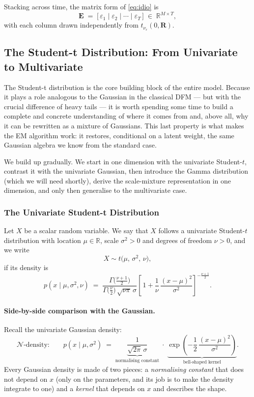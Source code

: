 \documentclass[11pt, a4paper, oneside]{article}
\newcommand{\mE}{\mathbf{E}}
\newcommand{\mR}{\mathbf{R}}
\begin{document}
Stacking across time, the matrix form of \eqref{eq:idio} is
\[
\mE \;=\; \big[\, \varepsilon_1 \mid \varepsilon_2 \mid \cdots \mid \varepsilon_T \,\big]
\;\in\; \mathbb{R}^{M \times T},
\]
with each column drawn independently from $t_{\nu_\varepsilon}(0, \mR)$.

\newpage

\subsection{The Student-t Distribution: From Univariate to Multivariate}
\label{sec:mvt}

The Student-t distribution is the core building block of the entire model.
Because it plays a role analogous to the Gaussian in the classical DFM — but
with the crucial difference of heavy tails — it is worth spending some time
to build a complete and concrete understanding of where it comes from
and, above all, why it can be rewritten as a mixture
of Gaussians. This last property is what makes the EM algorithm work: it
restores, conditional on a latent weight, the same Gaussian algebra we know
from the standard case.

We build up gradually. We start in one dimension with the univariate
Student-$t$, contrast it with the univariate Gaussian, then introduce the
Gamma distribution (which we will need shortly), derive the scale-mixture
representation in one dimension, and only then generalise to the multivariate case.

\subsubsection{The Univariate Student-t Distribution}

Let $X$ be a scalar random variable. We say that $X$ follows a univariate
Student-$t$ distribution with location $\mu \in \mathbb{R}$, scale
$\sigma^2 > 0$ and degrees of freedom $\nu > 0$, and we write
\[
X \sim t\!\big(\mu,\, \sigma^2,\, \nu\big),
\]
if its density is
\begin{equation}
p(x \mid \mu, \sigma^2, \nu) \;=\;
\frac{\Gamma\!\big(\tfrac{\nu+1}{2}\big)}{\Gamma\!\big(\tfrac{\nu}{2}\big)\,\sqrt{\nu\pi}\,\sigma}
\left[\,1 + \frac{1}{\nu}\,\frac{(x-\mu)^2}{\sigma^2}\right]^{-\frac{\nu+1}{2}}.
\label{eq:t-univariate}
\end{equation}


\paragraph{Side-by-side comparison with the Gaussian.}
Recall the univariate Gaussian density:
\[
\mathcal{N}\text{-density:} \qquad
p(x \mid \mu, \sigma^2) \;=\;
\underbrace{\frac{1}{\sqrt{2\pi}\,\sigma}}_{\text{normalising constant}}
\;\cdot\;
\underbrace{\exp\!\left(-\frac{1}{2}\,\frac{(x-\mu)^2}{\sigma^2}\right)}_{\text{bell-shaped kernel}}.
\]
Every Gaussian density is made of two pieces: a \emph{normalising constant}
that does not depend on $x$ (only on the parameters, and its job is to make
the density integrate to one) and a \emph{kernel} that depends on $x$ and
describes the shape.
\end{document}
